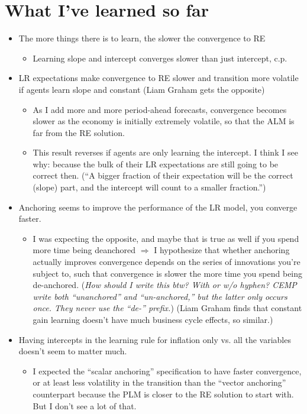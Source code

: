 \documentclass[11pt]{article}
\renewcommand{\[}{\begin{equation}}
\renewcommand{\]}{\end{equation}}
\begin{document}
\section{What I've learned so far} 
\begin{itemize}
\item The more things there is to learn, the slower the convergence to RE
\begin{itemize}
\item Learning slope and intercept converges slower than just intercept, c.p.
\end{itemize}
\item LR expectations make convergence to RE slower and transition more volatile if agents learn slope and constant (Liam Graham gets the opposite)
\begin{itemize}
\item As I add more and more period-ahead forecasts, convergence becomes slower as the economy is initially extremely volatile, so that the ALM is far from the RE solution.
\item This result reverses if agents are only learning the intercept. I think I see why: because the bulk of their LR expectations are still going to be correct then. (``A bigger fraction of their expectation will be the correct (slope) part, and the intercept will count to a smaller fraction.'')
\end{itemize}
\item Anchoring seems to improve the performance of the LR model, you converge faster. 
\begin{itemize}
\item I was expecting the opposite, and maybe that is true as well if you spend more time being deanchored $\Rightarrow$ I hypothesize that whether anchoring actually improves convergence depends on the series of innovations you're subject to, such that convergence is slower the more time you spend being de-anchored. (\emph{How should I write this btw? With or w/o hyphen? CEMP write both ``unanchored'' and ``un-anchored,'' but the latter only occurs once. They never use the ``de-'' prefix.}) (Liam Graham finds that constant gain learning doesn't have much business cycle effects, so similar.)
\end{itemize}
\item Having intercepts in the learning rule for inflation only vs. all the variables doesn't seem to matter much.
\begin{itemize}
\item I expected the ``scalar anchoring'' specification to have faster convergence, or at least less volatility in the transition than the ``vector anchoring'' counterpart because the PLM is closer to the RE solution to start with. But I don't see a lot of that.

\end{itemize}
\end{itemize}
\end{document}
